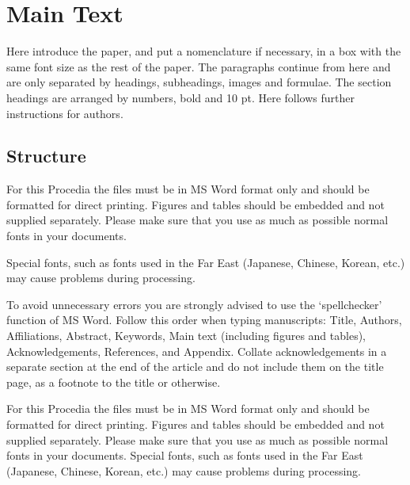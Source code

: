 \documentclass[3p,times,procedia]{elsarticle}
\begin{document}


\section{Main Text}
\label{main}

Here introduce the paper, and put a nomenclature if necessary, in a box with the same font size as the rest of the paper. The paragraphs continue from here and are only separated by headings, subheadings, images and formulae. The section headings are arranged by numbers, bold and 10 pt. Here follows further instructions for authors.

\begin{nomenclature}
\begin{deflist}[A]
\end{deflist}
\end{nomenclature}

\subsection{ Structure}
For this Procedia the files must be in MS Word format only and should be formatted for direct printing. Figures and tables should be embedded and not supplied separately. Please make sure that you use as much as possible normal fonts in your documents.

Special fonts, such as fonts used in the Far East (Japanese, Chinese, Korean, etc.) may cause problems during processing.
 
To avoid unnecessary errors you are strongly advised to use the `spellchecker' function of MS Word. Follow this order when typing manuscripts: Title, Authors, Affiliations, Abstract, Keywords, Main text (including figures and tables), Acknowledgements, References, and Appendix. Collate acknowledgements in a separate section at the end of the article and do not include them on the title page, as a footnote to the title or otherwise.

For this Procedia the files must be in MS Word format only and should be formatted for direct printing. Figures and tables should be embedded and not supplied separately. Please make sure that you use as much as possible normal fonts in your documents. Special fonts, such as fonts used in the Far East (Japanese, Chinese, Korean, etc.) may cause problems during processing.
\end{document}
